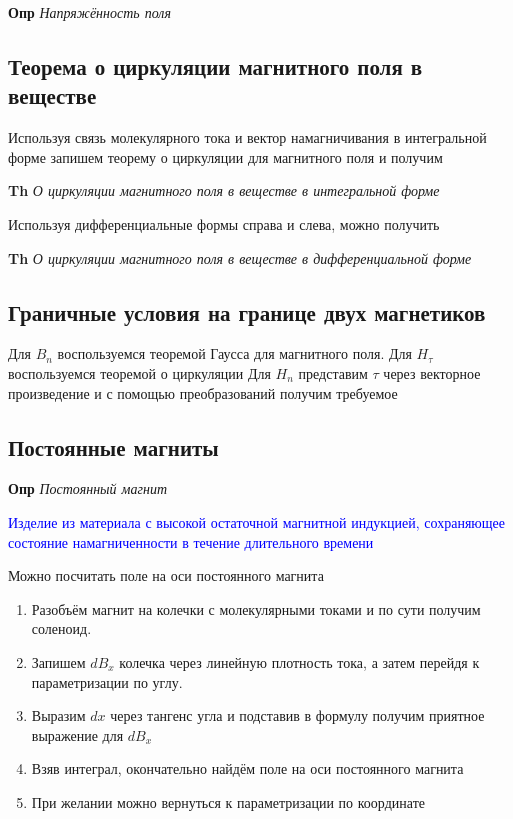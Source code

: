 \documentclass[a4paper, 14pt]{article}
\begin{document}
    \textbf{Опр} \textit{Напряжённость поля}
    
    \subsection{Теорема о циркуляции магнитного поля в веществе}
    
    Используя связь молекулярного тока и вектор намагничивания в интегральной форме запишем теорему о циркуляции для
    магнитного поля и получим
    
    \textbf{Th} \textit{О циркуляции магнитного поля в веществе в интегральной форме}
    
    Используя дифференциальные формы справа и слева, можно получить
    
    \textbf{Th} \textit{О циркуляции магнитного поля в веществе в дифференциальной форме}
    
    \subsection{Граничные условия на границе двух магнетиков}
    
    Для $B_n$ воспользуемся теоремой Гаусса для магнитного поля.
    Для $H_\tau$ воспользуемся теоремой о циркуляции
    Для $H_n$ представим $\tau$ через векторное произведение и с помощью преобразований получим требуемое
    
    \subsection{Постоянные магниты}
    
    \textbf{Опр} \textit{Постоянный магнит}
    
    \textcolor{blue}{Изделие из материала с высокой остаточной магнитной индукцией, сохраняющее состояние
    намагниченности в течение длительного времени}
    
    Можно посчитать поле на оси постоянного магнита
    
    \begin{enumerate}
        \item Разобъём магнит на колечки с молекулярными токами и по сути получим соленоид.
        \item Запишем $dB_x$ колечка через линейную плотность тока, а затем перейдя к параметризации по углу.
        \item Выразим $dx$ через тангенс угла и подставив в формулу получим приятное выражение для $dB_x$
        \item Взяв интеграл, окончательно найдём поле на оси постоянного магнита
        \item При желании можно вернуться к параметризации по координате
    \end{enumerate}
    
\end{document}
